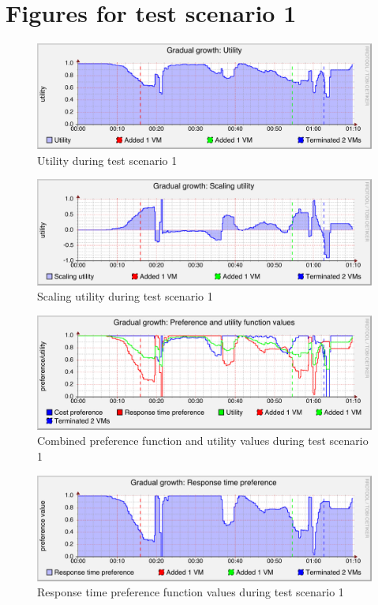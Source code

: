 \documentclass[english]{tktltiki2}
\theoremstyle{definition}
\theoremstyle{remark}
\begin{document}
\clearpage
\appendix

\section{Figures for test scenario 1}

\begin{figure}[htbp]
	\includegraphics[width=\textwidth]{images/utilitygraph-test21}
	\caption{Utility during test scenario 1}
	\label{fig:utilityScenario1}
\end{figure}

\begin{figure}[htbp]
	\includegraphics[width=\textwidth]{images/scalingutilitygraph-test21}
	\caption{Scaling utility during test scenario 1}
	\label{fig:scalingUtilityScenario1}
\end{figure}

\begin{figure}[htbp]
	\includegraphics[width=\textwidth]{images/preferencesgraph-test21}
	\caption{Combined preference function and utility values during test scenario 1}
	\label{fig:preferencesScenario1}
\end{figure}

\begin{figure}[htbp]
	\includegraphics[width=\textwidth]{images/responsetimepreferencegraph-test21}
	\caption{Response time preference function values during test scenario 1}
	\label{fig:responseTimePreferenceScenario1}
\end{figure}
\end{document}
